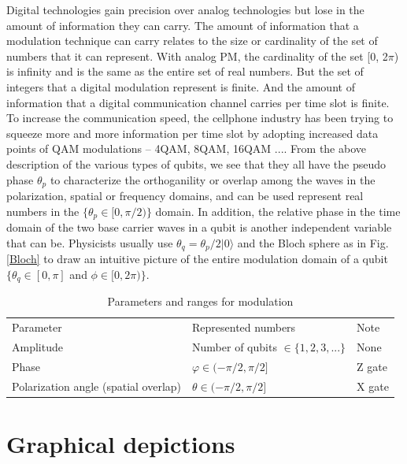 \documentclass{book}
\newcommand\keta[2][]{#1\lvert {#2} #1\rangle}
\begin{document}
Digital technologies gain precision over analog technologies but lose in the amount of information they can carry. The amount of information that a modulation technique can carry relates to the size or cardinality of the set of numbers that it can represent. With analog PM, the cardinality of the set [0, 2$\pi$) is infinity and is the same as the entire set of real numbers. But the set of integers that a digital modulation represent is finite. And the amount of information that a digital communication channel carries per time slot is finite. To increase the communication speed, the cellphone industry has been trying to squeeze more and more information per time slot by adopting increased data points of QAM modulations -- 4QAM, 8QAM, 16QAM ....
From the above description of the various types of qubits, we see that they all have the pseudo phase $\theta_p$ to characterize the 
orthoganility or overlap among the waves in the polarization, spatial or frequency domains, and can be used represent real numbers in the $\{\theta_p \in [0, \pi/2)\}$ domain. In addition, the relative phase in the time domain of the two base carrier waves in a qubit is another independent variable that can be. Physicists usually use $\theta_q = \theta_p/2 \keta{0}$ and the Bloch sphere as in Fig. \ref{Bloch} to draw an intuitive picture of the entire modulation domain of a qubit $\{\theta_q \in [0, \pi]$ and $\phi \in [0, 2\pi)\}$.

\begin{table}[]
\caption{Parameters and ranges for modulation}
\label{modulation-parameters}
\begin{tabular}{lll}
Parameter &Represented numbers &Note                 \\
Amplitude &Number of qubits $\in \{1, 2, 3, ...\}$   & None \\
Phase & $\varphi \in (-\pi /2, \pi /2] $& Z gate \\
Polarization angle (spatial overlap) & $\theta \in (-\pi /2, \pi /2]$ &X gate
\end{tabular}
\end{table}

\section{Graphical depictions}
\end{document}
